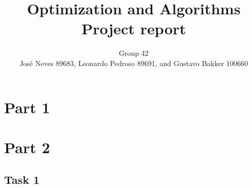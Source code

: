 \documentclass[12pt]{article}
\title{Optimization and Algorithms \\ Project report}
\author{Group 42 \\ Jos{\'e} Neves 89683, Leonardo Pedroso 89691, and Gustavo Bakker 100660}
\date{}
\begin{document}
\maketitle

\section{Part 1}

\section{Part 2}

\subsection{Task 1}
\end{document}

